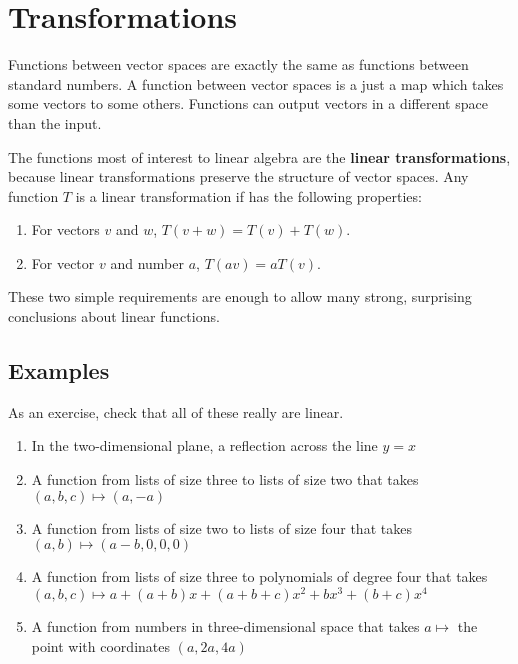 \documentclass{article}
\begin{document}
    \section{Transformations}
        Functions between vector spaces are exactly the same as functions between standard numbers. A function between vector spaces is a just a map which takes some vectors to some others. Functions can output vectors in a different space than the input. 

        The functions most of interest to linear algebra are the \textbf{linear transformations}, because linear transformations preserve the structure of vector spaces. Any function $T$ is a linear transformation if has the following properties:
        \begin{enumerate}
            \item For vectors $v$ and $w$, $T(v+w) = T(v) + T(w)$.
            \item For vector $v$ and number $a$, $T(av) = aT(v)$.
        \end{enumerate}
        These two simple requirements are enough to allow many strong, surprising conclusions about linear functions. 
        \subsection{Examples}
            As an exercise, check that all of these really are linear.
            \begin{enumerate}
                \item In the two-dimensional plane, a reflection across the line $y = x$
                \item A function from lists of size three to lists of size two that takes $(a, b, c) \mapsto (a, -a)$ 
                \item A function from lists of size two to lists of size four that takes $(a, b) \mapsto (a-b, 0, 0, 0)$ 
                \item A function from lists of size three to polynomials of degree four that takes $(a, b, c) \mapsto a + (a+b)x + (a+b+c)x^2 + bx^3 + (b+c)x^4$
                \item A function from numbers in three-dimensional space that takes $a \mapsto$ the point with coordinates $(a, 2a, 4a)$
            \end{enumerate}
\end{document}
